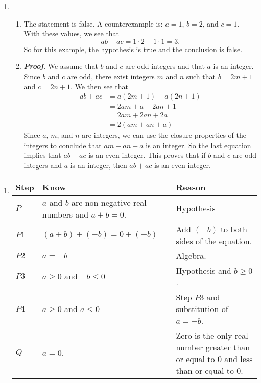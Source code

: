 \begin{enumerate}
\item \begin{enumerate} 
\item The statement is false.  A counterexample is:  $a = 1$, $b = 2$, and $c = 1$.  With these values, we see that
\[
ab + ac = 1 \cdot 2 + 1 \cdot 1 = 3.
\]
So for this example, the hypothesis is true and the conclusion is false.

\item \emph{\textbf{Proof}}.  We assume that $b$ and $c$ are odd integers and that $a$ is an integer.  Since $b$ and $c$ are odd, there exist integers $m$ and $n$ such that $b = 2m + 1$ and $c = 2n + 1$.  We then see that
\begin{align*}
ab + ac &= a(2m + 1) + a(2n + 1) \\
        &= 2am + a + 2an + 1 \\
        &= 2am + 2an + 2a \\
        &= 2(am + an + a)
\end{align*}
Since $a$, $m$, and $n$ are integers, we can use the closure properties of the integers to conclude that $am + an + a$ is an integer.  So the last equation implies that $ab + ac$ is an even integer.  This proves that if $b$ and $c$ are odd integers and $a$ is an integer, then $ab + ac$ is an even integer.
\end{enumerate}
\end{enumerate}


\begin{enumerate}
\item
\begin{tabular}[t]{|p{0.4in}|p{1.6in}|p{1.6in}|}
  \hline
  \textbf{Step}  &  \textbf{Know}  &  \textbf{Reason} \\ \hline
  $P$  &  $a$ and $b$ are non-negative real numbers and $a + b = 0$.  &  Hypothesis \\ \hline
  $P1$ &  $\left( a + b \right) + \left( -b \right) = 0 + \left( -b \right)$        &  Add $\left( -b \right)$ to both sides of the equation. \\ \hline
  $P2$ &  $a = -b$  &  Algebra. \\ \hline
  $P3$ &  $a \geq 0$ and $-b \leq 0$ &  Hypothesis and $b \geq 0$. \\ \hline
  $P4$ &  $a \geq 0$ and $a \leq 0$  &  Step $P3$ and substitution of $a = -b$. \\ \hline
  $Q$  &  $a = 0$. &  Zero is the only real number greater than or equal to 0 and less than or equal to 0.\\ \hline
\end{tabular}
\end{enumerate}


